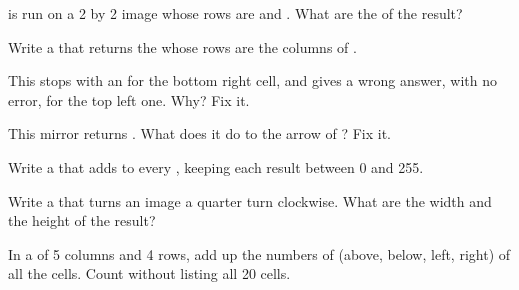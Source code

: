 \begin{exercise}[$\star$]\label{exo:g9:grids-and-images:3}
 is run on a 2 by 2 image whose rows are  and
. What are the  of the result?
\end{exercise}

\begin{exercise}[$\star$]\label{exo:g9:grids-and-images:4}
Write a   that returns the  whose rows are the
columns of .
\end{exercise}

\begin{exercise}[$\star\star$]\label{exo:g9:grids-and-images:5}
This  stops with an  for the bottom right cell, and gives
a wrong answer, with no error, for the top left one. Why? Fix it.

\label{lst:g9:grids-and-images:neighbours-bug}
\end{exercise}

\begin{exercise}[$\star\star$]\label{exo:g9:grids-and-images:6}
This mirror returns . What does it do to the arrow of
? Fix it.
\end{exercise}

\begin{exercise}[$\star\star$]\label{exo:g9:grids-and-images:7}
Write a   that adds  to every
, keeping each result between 0 and 255.
\end{exercise}

\begin{exercise}[$\star\star$]\label{exo:g9:grids-and-images:8}
Write a   that turns an image a quarter turn
clockwise. What are the width and the height of the result?
\end{exercise}

\begin{exercise}[$\star\star$]\label{exo:g9:grids-and-images:9}
In a  of 5 columns and 4 rows, add up the numbers of  (above,
below, left, right) of all the cells. Count without listing all 20 cells.
\end{exercise}

